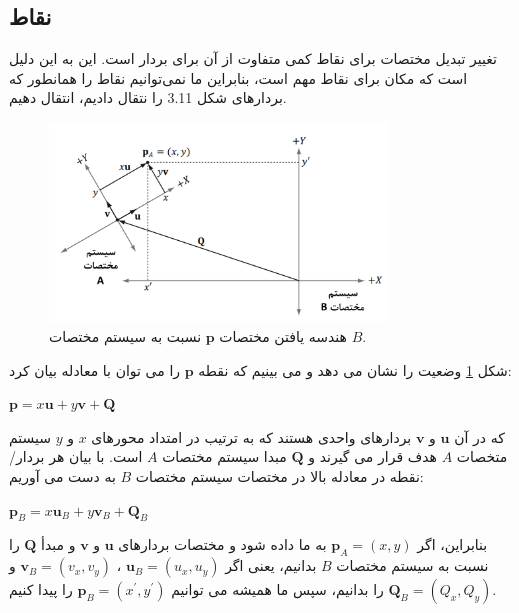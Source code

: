 \subsection{\textbf{نقاط}}
\label{subsec:3.4.2}
{
    \Large
    \begin{spacing}{1.5}
        تغییر تبدیل مختصات برای نقاط کمی متفاوت از آن برای بردار است.
        این به این دلیل است که مکان برای نقاط مهم است، بنابراین ما نمی‌توانیم نقاط را همانطور که بردارهای شکل 3.11 را نتقال دادیم، انتقال دهیم.

        \begin{figure}[H]
            \centering
            \setlength{\belowcaptionskip}{-10pt}
            \includegraphics[width=0.8\textwidth]{Images/4/3/4.Session.1.3.12}
            \caption {هندسه یافتن مختصات $\textbf{p}$ نسبت به سیستم مختصات $B$.}
            \label{fig:4.Session.1.3.12}
        \end{figure}

        شکل \ref{fig:4.Session.1.3.12} وضعیت را نشان می دهد و می بینیم که نقطه $\textbf{p}$ را می توان با معادله بیان کرد:

        \begin{center}
            $\textbf{p}=x\textbf{u}+y\textbf{v}+\textbf{Q}$
        \end{center}

        که در آن $\textbf{u}$ و $\textbf{v}$ بردارهای واحدی هستند که به ترتیب در امتداد محورهای $x$ و $y$ سیستم متخصات $A$ هدف قرار می گیرند و $\textbf{Q}$ مبدا سیستم مختصات $A$ است.
        با بیان هر بردار/نقطه در معادله بالا در مختصات سیستم مختصات $B$ به دست می آوریم:

        \begin{center}
            $\textbf{p}_{B}=x\textbf{u}_{B}+y\textbf{v}_{B}+\textbf{Q}_{B}$
        \end{center}

        بنابراین، اگر $\textbf{p}_{A}=(x, y)$ به ما داده شود و مختصات بردارهای $\textbf{u}$ و $\textbf{v}$ و مبدأ $\textbf{Q}$ را نسبت به سیستم مختصات $B$ بدانیم، یعنی اگر $\textbf{u}_{B}=(u_{x}, u_{y})$ ، $\textbf{v}_{B}=(v_{x}, v_{y})$ و $\textbf{Q}_{B}=(Q_{x}, Q_{y})$ را بدانیم، سپس ما همیشه می توانیم $\textbf{p}_{B}=(x^\prime, y^\prime)$ را پیدا کنیم.


\end{spacing}}
